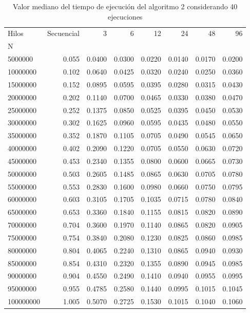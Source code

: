 \documentclass{report}
\begin{document}
\begin{appendices}
\begin{table}[H]
\begin{tabular}{lrrrrrrr}
\toprule
Hilos &  Secuencial &       3 &       6 &      12 &      24 &      48 &      96 \\
N         &             &         &         &         &         &         &         \\
\midrule
5000000   &       0.055 &  0.0400 &  0.0300 &  0.0220 &  0.0140 &  0.0170 &  0.0200 \\
10000000  &       0.102 &  0.0640 &  0.0425 &  0.0320 &  0.0240 &  0.0250 &  0.0360 \\
15000000  &       0.152 &  0.0895 &  0.0595 &  0.0395 &  0.0280 &  0.0315 &  0.0430 \\
20000000  &       0.202 &  0.1140 &  0.0700 &  0.0465 &  0.0330 &  0.0380 &  0.0470 \\
25000000  &       0.252 &  0.1375 &  0.0850 &  0.0525 &  0.0395 &  0.0450 &  0.0530 \\
30000000  &       0.302 &  0.1625 &  0.0960 &  0.0595 &  0.0435 &  0.0480 &  0.0550 \\
35000000  &       0.352 &  0.1870 &  0.1105 &  0.0705 &  0.0490 &  0.0545 &  0.0650 \\
40000000  &       0.402 &  0.2090 &  0.1220 &  0.0705 &  0.0550 &  0.0630 &  0.0720 \\
45000000  &       0.453 &  0.2340 &  0.1355 &  0.0800 &  0.0600 &  0.0665 &  0.0730 \\
50000000  &       0.503 &  0.2605 &  0.1485 &  0.0865 &  0.0630 &  0.0705 &  0.0780 \\
55000000  &       0.553 &  0.2830 &  0.1600 &  0.0980 &  0.0660 &  0.0750 &  0.0795 \\
60000000  &       0.603 &  0.3105 &  0.1705 &  0.1035 &  0.0715 &  0.0780 &  0.0840 \\
65000000  &       0.653 &  0.3360 &  0.1840 &  0.1155 &  0.0815 &  0.0820 &  0.0890 \\
70000000  &       0.704 &  0.3600 &  0.1970 &  0.1140 &  0.0865 &  0.0820 &  0.0905 \\
75000000  &       0.754 &  0.3840 &  0.2080 &  0.1230 &  0.0825 &  0.0860 &  0.0985 \\
80000000  &       0.804 &  0.4065 &  0.2240 &  0.1310 &  0.0865 &  0.0940 &  0.0930 \\
85000000  &       0.854 &  0.4310 &  0.2320 &  0.1355 &  0.0890 &  0.0945 &  0.0985 \\
90000000  &       0.904 &  0.4550 &  0.2490 &  0.1410 &  0.0940 &  0.0955 &  0.0995 \\
95000000  &       0.955 &  0.4785 &  0.2580 &  0.1440 &  0.0995 &  0.1015 &  0.1045 \\
100000000 &       1.005 &  0.5070 &  0.2725 &  0.1530 &  0.1015 &  0.1040 &  0.1060 \\
\bottomrule
\end{tabular}
\caption{Valor mediano del tiempo de ejecución del algoritmo 2
  considerando 40 ejecuciones}
\label{table:squares-alg2-data}
\end{table}
\end{appendices}
\end{document}

